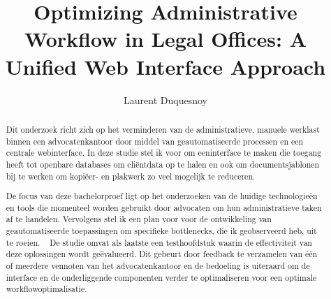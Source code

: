 \documentclass{hogent-article}
\title{Optimizing Administrative Workflow in Legal Offices: A Unified Web Interface Approach}
\author{Laurent Duquesnoy}
\begin{document}
\begin{abstract}
  Dit onderzoek richt zich op het verminderen van de administratieve, manuele werklast binnen een advocatenkantoor door middel van geautomatiseerde processen en een 
  centrale webinterface.   
  In deze studie stel ik voor om eeninterface te maken die toegang heeft tot openbare databases om cliëntdata op te halen en ook om 
  documentsjablonen bij te werken om kopiëer- en plakwerk zo veel mogelijk te reduceren.  
  
  De focus van deze bachelorproef ligt op het onderzoeken van de huidige technologieën en tools die
  momenteel worden gebruikt door advocaten om hun administratieve taken af te handelen. 
  Vervolgens stel ik een plan voor voor de ontwikkeling van geautomatiseerde toepassingen om specifieke bottlenecks, die ik geobserveerd heb, uit te roeien.  
 
  De studie omvat als laatste een testhoofdstuk waarin de effectiviteit van deze oplossingen wordt geëvalueerd. 
  Dit gebeurt door feedback te verzamelen van één of meerdere vennoten van het advocatenkantoor en de bedoeling is uiteraard om de interface en de onderliggende componenten
  verder te optimaliseren voor een optimale workflowoptimalisatie.  
\end{abstract}

\tableofcontents



\printbibliography[heading=bibintoc]
\end{document}
